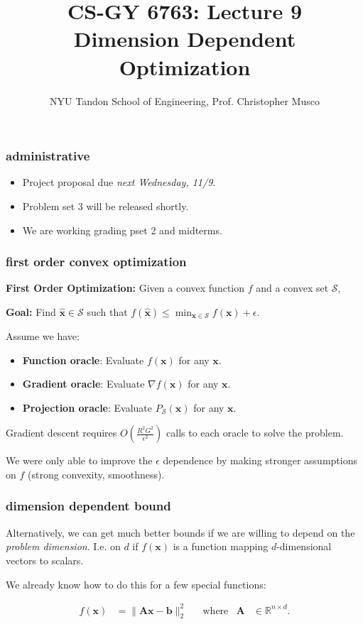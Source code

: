 \documentclass[compress]{beamer}
\title{CS-GY 6763: Lecture 9 \\ Dimension Dependent Optimization}
\author{NYU Tandon School of Engineering, Prof. Christopher Musco}
\date{}
\newcommand{\bv}[1]{\mathbf{#1}}
\newcommand{\R}{\mathbb{R}}
\begin{document}
\begin{frame}
	\titlepage 
\end{frame}


\begin{frame}[t]
	\frametitle{administrative}
	\begin{itemize}
		\item Project proposal due \emph{next Wednesday, 11/9}.
		\item Problem set 3 will be released shortly.
		\item We are working grading pset 2 and midterms.
	\end{itemize}
\end{frame}

\begin{frame}[t]
	\frametitle{first order convex optimization}
	\textbf{First Order Optimization:} Given a convex function $f$ and a convex set $\mathcal{S}$, 
	\begin{center}
		\textbf{Goal:} Find $\hat{\bv{x}}\in \mathcal{S}$ such that $f(\hat{\bv{x}}) \leq \min_{\bv{x}\in \mathcal{S}}f(\bv{x})+\epsilon$.
	\end{center}
	Assume we have:
	\begin{itemize}
		\item \textbf{Function oracle}: Evaluate $f(\bv{x})$ for any $\bv{x}$. 
		\item \textbf{Gradient oracle}: Evaluate $\nabla f(\bv{x})$ for any $\bv{x}$.
		\item \textbf{{Projection oracle}}: Evaluate $P_{\mathcal{S}}(\bv{x})$ for any $\bv{x}$.
	\end{itemize}
Gradient descent requires $O\left(\frac{R^2G^2}{\epsilon^2}\right)$ calls to each oracle  to solve the problem. 

We were only able to improve the $\epsilon$ dependence by making stronger assumptions on $f$ (strong convexity, smoothness). 
\end{frame}

\begin{frame}[t]
	\frametitle{dimension dependent bound}
	Alternatively, we can get much better bounds if we are willing to depend on the \emph{problem dimension}. I.e. on $d$ if $f(\bv{x})$ is a function mapping $d$-dimensional vectors to scalars.   
	
	We already know how to do this for a few special functions:
	
	\begin{align*}
		f(\bv{x}) &= \|\bv{A}\bv{x} - \bv{b}\|_2^2 & &\text{where} & \bv{A}&\in \R^{n\times d}.
	\end{align*}
	
\end{frame}
\end{document}
